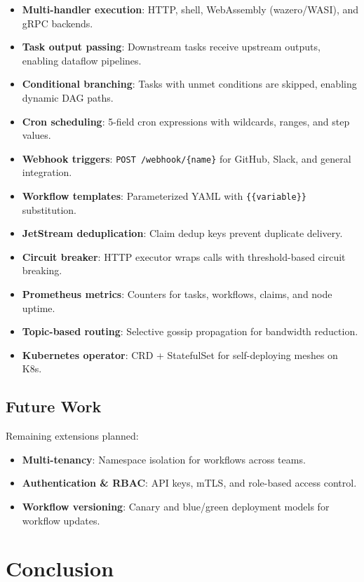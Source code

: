\documentclass[sigconf]{acmart}
\begin{document}
\begin{itemize}
\item \textbf{Multi-handler execution}: HTTP, shell, WebAssembly (wazero/WASI), and gRPC backends.
\item \textbf{Task output passing}: Downstream tasks receive upstream outputs, enabling dataflow pipelines.
\item \textbf{Conditional branching}: Tasks with unmet conditions are skipped, enabling dynamic DAG paths.
\item \textbf{Cron scheduling}: 5-field cron expressions with wildcards, ranges, and step values.
\item \textbf{Webhook triggers}: \texttt{POST /webhook/\{name\}} for GitHub, Slack, and general integration.
\item \textbf{Workflow templates}: Parameterized YAML with \texttt{\{\{variable\}\}} substitution.
\item \textbf{JetStream deduplication}: Claim dedup keys prevent duplicate delivery.
\item \textbf{Circuit breaker}: HTTP executor wraps calls with threshold-based circuit breaking.
\item \textbf{Prometheus metrics}: Counters for tasks, workflows, claims, and node uptime.
\item \textbf{Topic-based routing}: Selective gossip propagation for bandwidth reduction.
\item \textbf{Kubernetes operator}: CRD + StatefulSet for self-deploying meshes on K8s.
\end{itemize}

\subsection{Future Work}

Remaining extensions planned:

\begin{itemize}
\item \textbf{Multi-tenancy}: Namespace isolation for workflows across teams.
\item \textbf{Authentication \& RBAC}: API keys, mTLS, and role-based access control.
\item \textbf{Workflow versioning}: Canary and blue/green deployment models for workflow updates.
\end{itemize}

\section{Conclusion}
\end{document}
